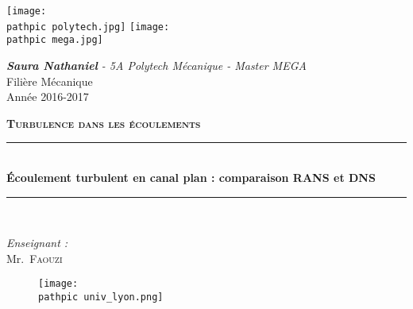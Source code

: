 \documentclass[a4paper,10pt]{article}
\newcommand\pathpic{/home/saura/Documents/Latex_files/Pic/}
\newcommand{\brik}{\color{brick}}
\newcommand{\indigo}{\color{indigo}}
\newcommand\darker{\color{Maroon}}
\newcommand\black{\color{black}}
\newcommand{\bl}{\color{blue}}
\newcommand{\reporttitle}{Écoulement turbulent en canal plan : comparaison RANS et DNS }     %
\newcommand{\reportauthor}{\darker \textbf{Saura Nathaniel} - 5A Polytech Mécanique - Master MEGA } %
\newcommand{\reportsubject}{\bl \indigo \textbf{Turbulence dans les écoulements}} %
\newcommand{\HRule}{\rule{\linewidth}{0.5mm}}
\begin{document}
\begin{titlepage}

\begin{center}

\begin{minipage}[t]{0.9\textwidth}
  \begin{flushleft}
    \texttt{[image: \\pathpic polytech.jpg]} \hfill
    \texttt{[image: \\pathpic mega.jpg]}
    \begin{spacing}{1.5}
    \end{spacing}
  \end{flushleft}
\end{minipage}
% 
\vspace{2cm}

    \emph{ \reportauthor}\\[1cm]
    \large{Filière Mécanique \\
    Année 2016-2017}
    
\vspace{1.5cm}
\textsc{\Large \reportsubject}\\[0.4cm]
\brik \HRule \\[0.4cm]
{\huge \bfseries \reporttitle}\\[0.4cm]
\HRule \\[1.5cm]

\black
\vspace{2cm}

    \emph{\large Enseignant :} \\[5mm]
    Mr.~\textsc{\large \darker Faouzi}

\vfill
\begin{figure}[h!]
  \begin{center}
  \texttt{[image: \\pathpic univ\_lyon.png]} \\[0.5cm]
  \end{center}
  \end{figure}

\end{center}

\end{titlepage}
\end{document}
